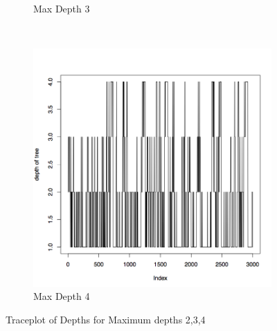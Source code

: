 \documentclass{article}
\begin{document}
\begin{figure}[H]
\begin{subfigure}[b]{0.3\textwidth}
                \caption{Max Depth 3}
                \label{fig:tiger}
        \end{subfigure}
        ~ %
        \begin{subfigure}[b]{0.3\textwidth}
                \centering
                \includegraphics[width=\textwidth]{depth_c4}
                \caption{Max Depth 4}
                \label{fig:mouse}
        \end{subfigure}
        \caption{Traceplot of Depths for Maximum depths 2,3,4}\label{fig:Boxplots234}
\end{figure}
\end{document}
